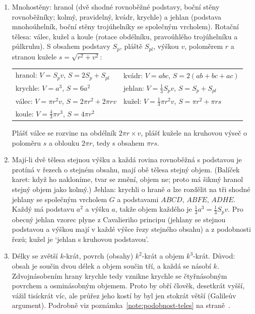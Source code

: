 \begin{enumerate}[label=\textbf{\arabic*.}, leftmargin=*, itemsep=0.8em]
  \item {}
  Mnohostěny: hranol (dvě shodné rovnoběžné podstavy, boční stěny rovnoběžníky; kolmý, pravidelný, kvádr, krychle) a jehlan (podstava mnohoúhelník, boční stěny trojúhelníky se společným vrcholem). Rotační tělesa: válec, kužel a koule (rotace obdélníku, pravoúhlého trojúhelníku a půlkruhu). S obsahem podstavy $S_p$, pláště $S_{pl}$, výškou $v$, poloměrem $r$ a stranou kužele $s = \sqrt{r^2 + v^2}$:
  \begin{center}
    \renewcommand{\arraystretch}{1.4}
    \begin{tabular}{ll}
      hranol: $V = S_pv$, $S = 2S_p + S_{pl}$ & kvádr: $V = abc$, $S = 2(ab + bc + ac)$\\
      krychle: $V = a^3$, $S = 6a^2$ & jehlan: $V = \frac{1}{3}S_pv$, $S = S_p + S_{pl}$\\
      válec: $V = \pi r^2v$, $S = 2\pi r^2 + 2\pi rv$ & kužel: $V = \frac{1}{3}\pi r^2v$, $S = \pi r^2 + \pi rs$\\
      koule: $V = \frac{4}{3}\pi r^3$, $S = 4\pi r^2$ &
    \end{tabular}
  \end{center}
  Plášť válce se rozvine na obdélník $2\pi r\times v$, plášť kužele na kruhovou výseč o poloměru $s$ a oblouku $2\pi r$, tedy s obsahem $\pi rs$. 

  \item {}
  Mají-li dvě tělesa stejnou výšku a každá rovina rovnoběžná s podstavou je protíná v řezech o stejném obsahu, mají obě tělesa stejný objem. (Balíček karet: když ho nakloníme, tvar se změní, objem ne; proto má šikmý hranol stejný objem jako kolmý.) Jehlan: krychli o hraně $a$ lze rozdělit na tři shodné jehlany se společným vrcholem $G$ a podstavami $ABCD$, $ABFE$, $ADHE$. Každý má podstavu $a^2$ a výšku $a$, takže objem každého je $\frac{1}{3}a^3 = \frac{1}{3}S_pv$. Pro obecný jehlan vzorec plyne z Cavalieriho principu (jehlany se stejnou podstavou a výškou mají v každé výšce řezy stejného obsahu) a z podobnosti řezů; kužel je `jehlan s kruhovou podstavou'. 

  \item {}
  Délky se zvětší $k$-krát, povrch (obsahy) $k^2$-krát a objem $k^3$-krát. Důvod: obsah je součin dvou délek a objem součin tří, a každá se násobí $k$. Zdvojnásobením hrany krychle tedy vznikne krychle se čtyřnásobným povrchem a osminásobným objemem. Proto by obří člověk, desetkrát vyšší, vážil tisíckrát víc, ale průřez jeho kostí by byl jen stokrát větší (Galileův argument). Podrobně viz poznámka~\ref{note:podobnost-teles} na straně~\pageref{note:podobnost-teles}.


\end{enumerate}
